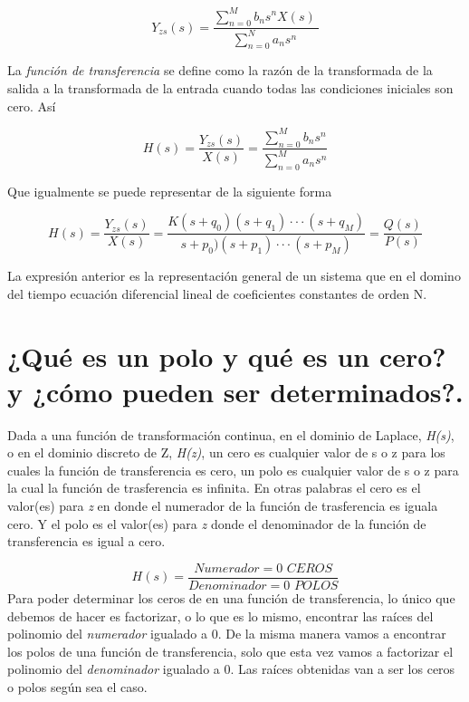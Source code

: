 \begin{equation}
	Y_{zs}(s)=\frac{\sum_{n=0}^M b_ns^nX(s)\ }{\sum_{n=0}^Na_ns^n\ }
\end{equation}

\noindent La \textit{función de transferencia} se define como la razón de la transformada de la salida a la transformada de la entrada cuando todas las condiciones iniciales son cero. Así

\begin{equation}
	H(s)=\frac{Y_{zs}(s)}{X(s)} = \frac{\sum_{n=0}^M b_ns^n}{\sum_{n=0}^M a_ns^n}
\end{equation}

\noindent Que igualmente se puede representar de la siguiente forma

\begin{equation}
	H(s)=\frac{Y_{zs}(s)}{X(s)} = \frac{K(s+q_0)(s+q_1)···(s+q_M)}{s+p_0)(s+p_1)···(s+p_M)} = \frac{Q(s)}{P(s)}
\end{equation}

\noindent La expresión anterior es la representación general de un sistema que en el domino del tiempo ecuación diferencial lineal de coeficientes constantes de orden N.
\section{¿Qué es un polo y qué es un cero? y ¿cómo pueden ser determinados?.}


Dada a una función de transformación continua, en el dominio de Laplace, \textit{H(s)}, o en el dominio discreto de Z, \textit{H(z)}, un cero es cualquier valor de s o z para los cuales la función de transferencia es cero, un polo es cualquier valor de s o z para la cual la función de trasferencia es infinita.\newline
En otras palabras el cero es el valor(es) para \textit{z} en donde el numerador de la función de trasferencia es iguala cero. Y el polo es el valor(es) para \textit{z} donde el denominador de la función de transferencia es igual a cero.

\[
H(s) = \frac{Numerador = 0 \textit{ CEROS} }{Denominador = 0 \textit{ POLOS}}
\]
\newline
Para poder determinar los ceros de en una función de transferencia, lo único que debemos de hacer es factorizar, o lo que es lo mismo, encontrar las raíces del polinomio del \textit{numerador} igualado a 0.\newline
De la misma manera vamos a encontrar los polos de una función de transferencia, solo que esta vez vamos a factorizar el polinomio del \textit{denominador} igualado a 0. Las raíces obtenidas van a ser los ceros o polos según sea el caso.\\


